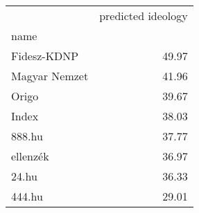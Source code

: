 \begin{tabular}{lr}
\toprule
{} &  predicted ideology \\
name          &                     \\
\midrule
Fidesz-KDNP   &               49.97 \\
Magyar Nemzet &               41.96 \\
Origo         &               39.67 \\
Index         &               38.03 \\
888.hu        &               37.77 \\
ellenzék      &               36.97 \\
24.hu         &               36.33 \\
444.hu        &               29.01 \\
\bottomrule
\end{tabular}
